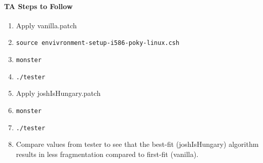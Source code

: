 \documentclass[titlepage,draftclsnofoot,onecolumn]{article}
\begin{document}
\paragraph{TA Steps to Follow}


\begin{enumerate}
  \item Apply vanilla.patch
	\item \texttt{source envivronment-setup-i586-poky-linux.csh}
	\item \texttt{monster}
  \item \texttt{./tester}
  \item Apply joshIsHungary.patch
	\item \texttt{monster}
  \item \texttt{./tester}
  \item Compare values from tester to see that the best-fit (joshIsHungary) algorithm results in less fragmentation compared to first-fit (vanilla).
  \end{enumerate}
\end{document}
